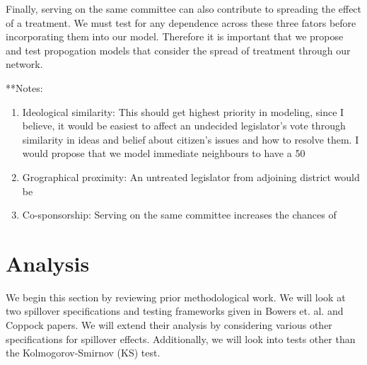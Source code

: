 \documentclass[12pt]{article}
\begin{document}
Finally, serving on the same committee can also contribute to spreading the effect of a treatment. We must test for any dependence across these three fators before incorporating them into our model. Therefore it is important that we propose and test propogation models that consider the spread of treatment through our network.


**Notes:
\begin{enumerate}

\item Ideological similarity: This should get highest priority in modeling, since I believe, it would be easiest to affect an undecided legislator's vote through similarity in ideas and belief about citizen's issues and how to resolve them. I would propose that we model immediate neighbours to have a 50%
\item Grographical proximity: An untreated legislator from adjoining district would be 
\item Co-sponsorship: Serving on the same committee increases the chances of 

\end{enumerate}



\section{Analysis}

We begin this section by reviewing prior methodological work. We will look at two spillover specifications and testing frameworks given in Bowers et. al. and Coppock papers. We will extend their analysis by considering various other specifications for spillover effects. Additionally, we will look into tests other than the Kolmogorov-Smirnov (KS) test.
\end{document}
